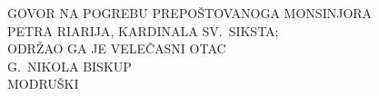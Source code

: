 \documentclass[a5paper,twoside]{article}
\begin{document}

\frenchspacing


\linespread{1.1}

\thispagestyle{empty}



\beginnumbering
\pstart


{\centering
\noindent GOVOR NA POGREBU PREPOŠTOVANOGA MONSINJORA\\
PETRA RIARIJA, KARDINALA SV.\ SIKSTA;\\
ODRŽAO GA JE VELEČASNI OTAC\\
G.~NIKOLA BISKUP\\
MODRUŠKI

}

\pend\vspace*{\baselineskip}




\numberpstarttrue

\setcounter{pstart}{1}
\end{document}
